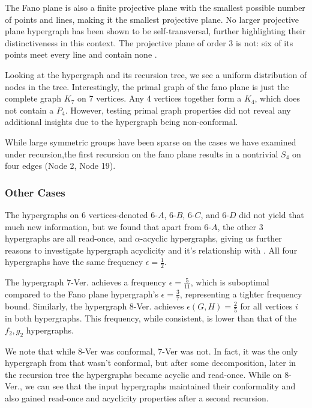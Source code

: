 The Fano plane is also a finite projective plane with the smallest possible number of points and lines, making it the smallest projective plane. No larger projective plane hypergraph has been shown to be self-transversal, further highlighting their distinctiveness in this context. The projective plane of order 3 is not: six of its points meet every line and contain none .

Looking at the hypergraph and its recursion tree, we see a uniform distribution of nodes in the tree. Interestingly, the primal graph of the fano plane is just the complete graph $K_7$ on 7 vertices. Any 4 vertices together form a $K_4$, which does not contain a $P_4$. However, testing primal graph properties did not reveal any additional insights due to the hypergraph being non-conformal.

While large symmetric groups have been sparse on the cases we have examined under \FKA{} recursion,the first recursion on the fano plane results in a nontrivial $S_4$ on four edges (Node 2, Node 19).

\subsubsection*{Other Cases}

The hypergraphs on 6 vertices-denoted 6-$A$, 6-$B$, 6-$C$, and 6-$D$ did not yield that much new information, but we found that apart from 6-$A$, the other 3 hypergraphs are all read-once, and $\alpha$-acyclic hypergraphs, giving us further reasons to investigate hypergraph acyclicity and it's relationship with \FKA. All four hypergraphs have the same frequency $\epsilon=\frac{1}{2}$.

The hypergraph 7-Ver. achieves a frequency $\epsilon=\frac{5}{11}$, which is suboptimal compared to the Fano plane hypergraph's $\epsilon=\frac{3}{7}$, representing a tighter frequency bound. Similarly, the hypergraph 8-Ver. achieves $\epsilon(G,H)=\frac{2}{5}$ for all vertices $i$ in both hypergraphs. This frequency, while consistent, is lower than that of the $f_2,g_2$ hypergraphs.

We note that while 8-Ver was conformal, 7-Ver was not. In fact, it was the only hypergraph from \cite{SS24} that wasn't conformal, but after some decomposition, later in the recursion tree the hypergraphs became acyclic and read-once. While on 8-Ver., we can see that the input hypergraphs maintained their conformality and also gained read-once and acyclicity properties after a second recursion.

